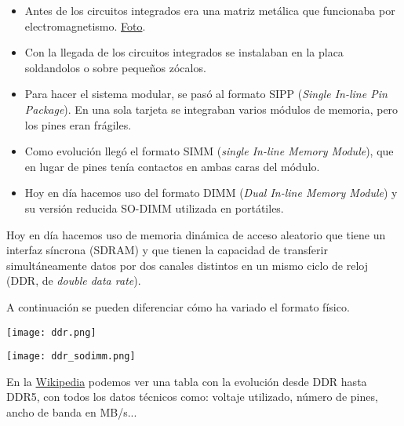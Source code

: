 \begin{itemize}
    \item Antes de los circuitos integrados era una matriz metálica que funcionaba por electromagnetismo. \href{https://es.wikipedia.org/wiki/Memoria_de_acceso_aleatorio#/media/Archivo:Electronic_Memory.jpg}{Foto}.
    \item Con la llegada de los circuitos integrados se instalaban en la placa soldandolos o sobre pequeños zócalos.
    \item Para hacer el sistema modular, se pasó al formato SIPP (\textit{Single In-line Pin Package}). En una sola tarjeta se integraban varios módulos de memoria, pero los pines eran frágiles.
    \item Como evolución llegó el formato SIMM (\textit{single In-line Memory Module}), que en lugar de pines tenía contactos en ambas caras del módulo.
    \item Hoy en día hacemos uso del formato DIMM (\textit{Dual In-line Memory Module}) y su versión reducida SO-DIMM utilizada en portátiles.
\end{itemize}

Hoy en día hacemos uso de memoria dinámica de acceso aleatorio que tiene un interfaz síncrona (SDRAM) y que tienen la capacidad de transferir simultáneamente datos por dos canales distintos en un mismo ciclo de reloj (DDR, de \textit{double data rate}).

A continuación se pueden diferenciar cómo ha variado el formato físico.

{
    \hfill
\begin{minipage}{0.45\linewidth}
    \texttt{[image: ddr.png]}
    \vspace{-30pt}
\end{minipage}
\hfill\hfill
\begin{minipage}{0.3\linewidth}
    \texttt{[image: ddr\_sodimm.png]}
    \vspace{-30pt}
\end{minipage}
\hfill
}

En la \href{https://en.wikipedia.org/wiki/DDR_SDRAM#Generations}{Wikipedia} podemos ver una tabla con la evolución desde DDR hasta DDR5, con todos los datos técnicos como: voltaje utilizado, número de pines, ancho de banda en MB/s...

